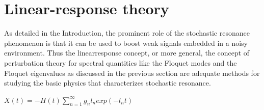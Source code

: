 \documentclass[10pt]{article}
\begin{document}
\section{Linear-response theory}
As detailed in the Introduction, the prominent role of the stochastic resonance phenomenon is that it can be used to boost weak signals embedded in a noisy environment\cite{hibibtex}. Thus the linearresponse concept, or more general, the concept of perturbation theory for spectral quantities like the Floquet modes and the Floquet eigenvalues as discussed in the previous section are adequate methods for studying the basic physics that characterizes stochastic resonance.\\
\par
$X(t)=-H(t)\sum_{n=1}^\infty g_n l_n exp(-l_n t)$\\

\end{document}
